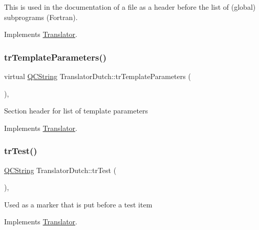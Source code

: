 This is used in the documentation of a file as a header before the list of (global) subprograms (Fortran). 

Implements \mbox{\hyperlink{class_translator}{Translator}}.

\mbox{\label{class_translator_dutch_a72b684311f1026c8af57f7dc4990222f}} 
\subsubsection{\texorpdfstring{trTemplateParameters()}{trTemplateParameters()}}
{\footnotesize\ttfamily virtual \mbox{\hyperlink{class_q_c_string}{Q\+C\+String}} Translator\+Dutch\+::tr\+Template\+Parameters (\begin{DoxyParamCaption}{ }\end{DoxyParamCaption})\hspace{0.3cm}{\ttfamily [inline]}, {\ttfamily [virtual]}}

Section header for list of template parameters 

Implements \mbox{\hyperlink{class_translator}{Translator}}.

\mbox{\label{class_translator_dutch_a06afe7808d93f5c37219cc9853bb0cfe}} 
\subsubsection{\texorpdfstring{trTest()}{trTest()}}
{\footnotesize\ttfamily \mbox{\hyperlink{class_q_c_string}{Q\+C\+String}} Translator\+Dutch\+::tr\+Test (\begin{DoxyParamCaption}{ }\end{DoxyParamCaption})\hspace{0.3cm}{\ttfamily [inline]}, {\ttfamily [virtual]}}

Used as a marker that is put before a test item 

Implements \mbox{\hyperlink{class_translator}{Translator}}.

\mbox{\label{class_translator_dutch_a1b28f1d7fb1f18e4140a49dce53ce130}} 
